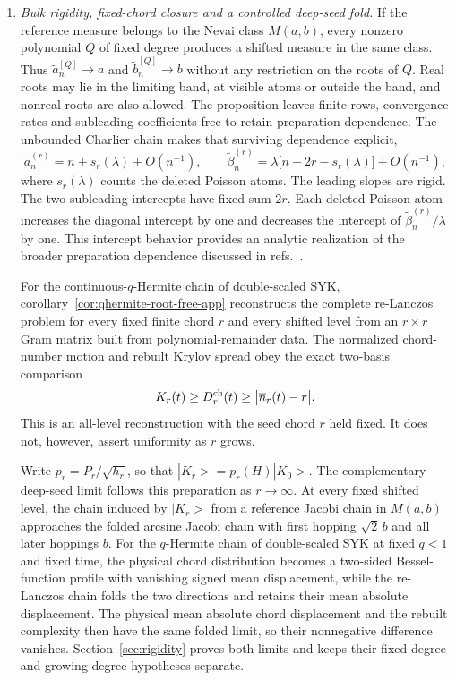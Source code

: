 \documentclass[a4paper,11pt]{article}
\def\ket#1{|#1>}%
\theoremstyle{definition}
\theoremstyle{remark}
\newcommand{\ket}[1]{|#1\rangle}
\begin{document}
\begin{enumerate}[label=\emph{(\roman*)},leftmargin=2.2em,itemsep=4pt,topsep=4pt,parsep=0pt]
\item \emph{Bulk rigidity, fixed-chord closure and a controlled deep-seed fold.}
If the reference measure belongs to the Nevai class $M(a,b)$, every nonzero polynomial $Q$ of
fixed degree produces a shifted measure in the same class.  Thus
$\widetilde a_n^{[Q]}\to a$ and $\widetilde b_n^{[Q]}\to b$ without any restriction on the roots
of $Q$.  Real roots may lie in the limiting band, at visible atoms or outside the band, and
nonreal roots are also allowed.  The proposition 
leaves finite rows, convergence rates and subleading coefficients free to retain preparation
dependence.  The unbounded Charlier chain makes that surviving dependence explicit,
\begin{equation}
   \widetilde a_n^{(r)}=n+s_r(\lambda)+O(n^{-1}),
   \qquad
   \widetilde\beta_n^{(r)}
   =\lambda\bigl[n+2r-s_r(\lambda)\bigr]+O(n^{-1}),
   \label{eq:intro-slopes-intercepts}
\end{equation}
where $s_r(\lambda)$ counts the deleted Poisson atoms.  The leading slopes are rigid.  The two subleading intercepts have fixed sum $2r$. Each deleted Poisson atom
increases the diagonal intercept by one and decreases the intercept of
$\widetilde\beta_n^{(r)}/\lambda$ by one.  This intercept behavior provides an analytic realization of the broader preparation dependence discussed in refs.~\cite{SreeramKannanModakAravinda2025,Balasubramanian:2025variations}.

For the continuous-$q$-Hermite chain of double-scaled SYK,
corollary~\ref{cor:qhermite-root-free-app} reconstructs the complete re-Lanczos problem for every
fixed finite chord $r$ and every shifted level from an $r\times r$ Gram matrix built from polynomial-remainder data.  The
normalized chord-number motion and rebuilt Krylov spread obey the exact two-basis comparison
\begin{equation}
   K_r(t)\ge D_r^{\rm ch}(t)\ge
   \bigl|\overline n_r(t)-r\bigr|.
   \label{eq:intro-chord-radial-bound}
\end{equation}
This is an all-level reconstruction with the seed chord $r$ held fixed.  It does not, however,
assert uniformity as $r$ grows.

Write $p_r=P_r/\sqrt{h_r}$, so that
$\ket{K_r}=p_r(H)\ket{K_0}$.  The complementary deep-seed limit follows this preparation as
$r\to\infty$.  At every fixed shifted level, the chain induced by $\ket{K_r}$ from a reference Jacobi chain in $M(a,b)$ approaches the folded arcsine
Jacobi chain with first hopping $\sqrt2\,b$ and all later hoppings $b$.  For the $q$-Hermite chain
of double-scaled SYK at fixed $q<1$ and fixed time, the physical chord distribution becomes a
two-sided Bessel-function profile with vanishing signed mean displacement, while the re-Lanczos chain folds the two
directions and retains their mean absolute displacement.  The physical mean absolute chord displacement and
the rebuilt complexity then have the same folded limit, so their nonnegative difference
vanishes.  Section~\ref{sec:rigidity} proves both
limits and keeps their fixed-degree and growing-degree hypotheses separate.


\end{enumerate}
\end{document}
